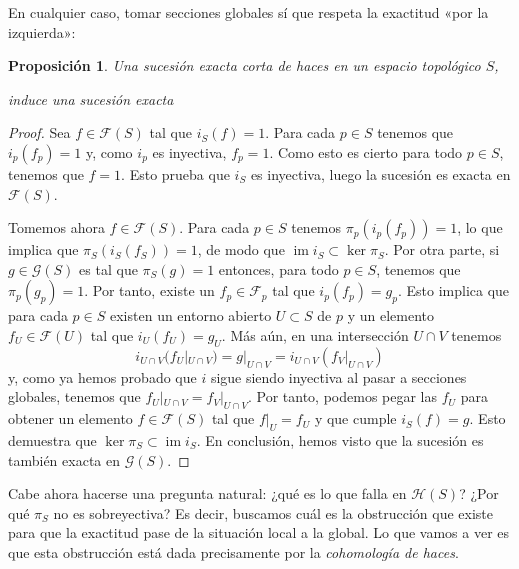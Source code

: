 \documentclass[12pt,a4paper]{article}
\newtheorem{prop}[thm]{Proposición}
\theoremstyle{definition} \newtheorem{defn}[thm]{Definición}
\theoremstyle{definition} \newtheorem{ejemplo}[thm]{Ejemplo}
\theoremstyle{definition} \newtheorem{ejercicio}[thm]{Ejercicio}
\def\FF{\mathscr{F}}
\def\GG{\mathscr{G}}
\def\HH{\mathscr{H}}
\DeclareMathOperator{\im}{im}
\begin{document}
    En cualquier caso, tomar secciones globales sí que respeta la exactitud «por la izquierda»:

    \begin{prop}
      Una sucesión exacta corta de haces en un espacio topológico $S$,
      \begin{center}
      \end{center}
      induce una sucesión exacta
      \begin{center}
      \end{center}
    \end{prop}
    \begin{proof}
      Sea $f\in \FF(S)$ tal que $i_S(f)=1$. Para cada $p\in S$ tenemos que $i_p(f_p)=1$ y, como $i_p$ es inyectiva, $f_p=1$. Como esto es cierto para todo $p\in S$, tenemos que $f=1$. Esto prueba que $i_S$ es inyectiva, luego la sucesión es exacta en $\FF(S)$.

      Tomemos ahora $f\in \FF(S)$. Para cada $p \in S$ tenemos $\pi_p(i_p(f_p))=1$, lo que implica que $\pi_S(i_S(f_S))=1$, de modo que $\im i_S \subset \ker \pi_S$. Por otra parte, si $g\in \GG(S)$ es tal que $\pi_S(g)=1$ entonces, para todo $p\in S$, tenemos que $\pi_p(g_p)=1$. Por tanto, existe un $f_p \in \FF_p$ tal que $i_p(f_p)=g_p$. Esto implica que para cada $p\in S$ existen un entorno abierto $U\subset S$ de $p$ y un elemento $f_U\in \FF(U)$ tal que $i_U(f_U)=g_U$. Más aún, en una intersección $U\cap V$ tenemos
      \begin{equation*}
	i_{U\cap V}(f_U|_{U\cap V}) = g|_{U\cap V} = i_{U\cap V}(f_V|_{U\cap V})
      \end{equation*}
      y, como ya hemos probado que $i$ sigue siendo inyectiva al pasar a secciones globales, tenemos que $f_U|_{U\cap V} = f_V|_{U\cap V}$. Por tanto, podemos pegar las $f_U$ para obtener un elemento $f\in \FF(S)$ tal que $f|_U=f_U$ y que cumple $i_S(f)=g$. Esto demuestra que $\ker \pi_S \subset \im i_S$. En conclusión, hemos visto que la sucesión es también exacta en $\GG(S)$.
    \end{proof}

    Cabe ahora hacerse una pregunta natural: ¿qué es lo que falla en $\HH(S)$? ¿Por qué $\pi_S$ no es sobreyectiva? Es decir, buscamos cuál es la obstrucción que existe para que la exactitud pase de la situación local a la global. Lo que vamos a ver es que esta obstrucción está dada precisamente por la \emph{cohomología de haces}.
\end{document}
